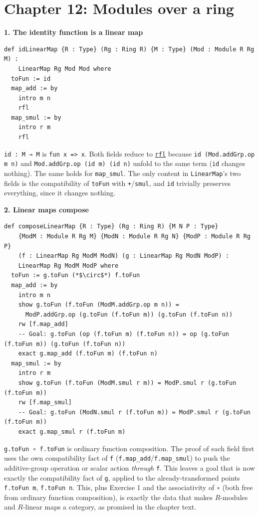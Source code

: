 \section{Chapter 12: Modules over a ring}\label{sec:15-appendix-solutions:10-chapter-11:1}

\textbf{1. The identity function is a linear map}

\begin{lstlisting}
def idLinearMap {R : Type} (Rg : Ring R) {M : Type} (Mod : Module R Rg M) :
    LinearMap Rg Mod Mod where
  toFun := id
  map_add := by
    intro m n
    rfl
  map_smul := by
    intro r m
    rfl
\end{lstlisting}

\texttt{id : M → M} is \texttt{fun x => x}. Both fields reduce to \href{https://lean-lang.org/doc/reference/latest/Tactic-Proofs/Tactic-Reference/}{\texttt{rfl}} because \texttt{id (Mod.addGrp.op m n)} and \texttt{Mod.addGrp.op (id m) (id n)} unfold to the same term (\texttt{id} changes nothing). The same holds for \texttt{map\_\allowbreak{}smul}. The only content in \texttt{LinearMap}'s two fields is the compatibility of \texttt{toFun} with \texttt{+}/\texttt{smul}, and \texttt{id} trivially preserves everything, since it changes nothing.

\textbf{2. Linear maps compose}

\begin{lstlisting}
def composeLinearMap {R : Type} (Rg : Ring R) {M N P : Type}
    {ModM : Module R Rg M} {ModN : Module R Rg N} {ModP : Module R Rg P}
    (f : LinearMap Rg ModM ModN) (g : LinearMap Rg ModN ModP) :
    LinearMap Rg ModM ModP where
  toFun := g.toFun (*$\circ$*) f.toFun
  map_add := by
    intro m n
    show g.toFun (f.toFun (ModM.addGrp.op m n)) =
      ModP.addGrp.op (g.toFun (f.toFun m)) (g.toFun (f.toFun n))
    rw [f.map_add]
    -- Goal: g.toFun (op (f.toFun m) (f.toFun n)) = op (g.toFun (f.toFun m)) (g.toFun (f.toFun n))
    exact g.map_add (f.toFun m) (f.toFun n)
  map_smul := by
    intro r m
    show g.toFun (f.toFun (ModM.smul r m)) = ModP.smul r (g.toFun (f.toFun m))
    rw [f.map_smul]
    -- Goal: g.toFun (ModN.smul r (f.toFun m)) = ModP.smul r (g.toFun (f.toFun m))
    exact g.map_smul r (f.toFun m)
\end{lstlisting}

\texttt{g.toFun ∘ f.toFun} is ordinary function composition. The proof of each field first uses the own compatibility fact of \texttt{f} (\texttt{f.map\_\allowbreak{}add}/\texttt{f.map\_\allowbreak{}smul}) to push the additive-group operation or scalar action \emph{through} \texttt{f}. This leaves a goal that is now exactly the compatibility fact of \texttt{g}, applied to the already-transformed points \texttt{f.toFun m}, \texttt{f.toFun n}. This, plus Exercise 1 and the associativity of \texttt{∘} (both free from ordinary function composition), is exactly the data that makes \(R\)-modules and \(R\)-linear maps a category, as promised in the chapter text.

